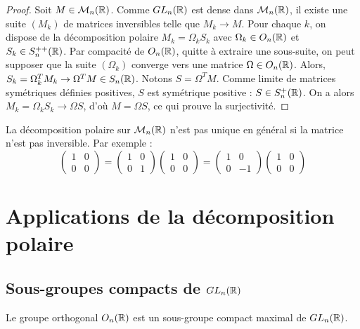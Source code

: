 \begin{proof}

    Soit $M \in \mathcal{M}_n(\mathbb{R})$. Comme $GL_n(\mathbb{R})$ est dense dans $\mathcal{M}_n(\mathbb{R})$, il existe une suite $(M_k)$ de matrices inversibles telle que $M_k \to M$.
    Pour chaque $k$, on dispose de la décomposition polaire $M_k = \Omega_k S_k$ avec $\Omega_k \in O_n(\mathbb{R})$ et $S_k \in S_n^{++}(\mathbb{R})$.
    Par compacité de $O_n(\mathbb{R})$, quitte à extraire une sous-suite, on peut supposer que la suite $(\Omega_k)$ converge vers une matrice $\Omega \in O_n(\mathbb{R})$.
    Alors, $S_k = \Omega_k^T M_k \to \Omega^T M \in S_n(\mathbb{R})$. Notons $S = \Omega^T M$.
    Comme limite de matrices symétriques définies positives, $S$ est symétrique positive : $S \in S_n^+(\mathbb{R})$.
    On a alors $M_k = \Omega_k S_k \to \Omega S$, d'où $M = \Omega S$, ce qui prouve la surjectivité.
\end{proof}

\begin{remarque}
    La décomposition polaire sur $\mathcal{M}_n(\mathbb{R})$ n'est pas unique en général si la matrice n'est pas inversible.
    Par exemple :
    \[ \begin{pmatrix} 1 & 0 \\ 0 & 0 \end{pmatrix} = \begin{pmatrix} 1 & 0 \\ 0 & 1 \end{pmatrix} \begin{pmatrix} 1 & 0 \\ 0 & 0 \end{pmatrix} = \begin{pmatrix} 1 & 0 \\ 0 & -1 \end{pmatrix} \begin{pmatrix} 1 & 0 \\ 0 & 0 \end{pmatrix} \]
\end{remarque}

\section{Applications de la décomposition polaire}

\subsection{Sous-groupes compacts de \texorpdfstring{$GL_n(\mathbb{R})$}{GLn(R)}}

\begin{corollaire}{}{}
    Le groupe orthogonal $O_n(\mathbb{R})$ est un sous-groupe compact maximal de $GL_n(\mathbb{R})$.
\end{corollaire}

